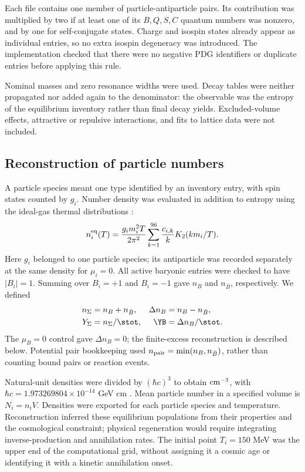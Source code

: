 Each file contains one member of particle-antiparticle pairs. Its contribution was multiplied by two if at least one of its $B,Q,S,C$ quantum numbers was nonzero, and by one for self-conjugate states. Charge and isospin states already appear as individual entries, so no extra isospin degeneracy was introduced. The implementation checked that there were no negative PDG identifiers or duplicate entries before applying this rule.

Nominal masses and zero resonance widths were used. Decay tables were neither propagated nor added again to the denominator: the observable was the entropy of the equilibrium inventory rather than final decay yields. Excluded-volume effects, attractive or repulsive interactions, and fits to lattice data were not included.

\subsection{Reconstruction of particle numbers}
A particle species meant one type identified by an inventory entry, with spin states counted by $g_i$. Number density was evaluated in addition to entropy using the ideal-gas thermal distributions \citep{Vovchenko2019}:
\begin{equation}
n_i^{\rm eq}(T)=\frac{g_i m_i^2T}{2\pi^2}
\sum_{k=1}^{96}\frac{c_{i,k}}{k}K_2(km_i/T).
\label{eq:number}
\end{equation}
Here $g_i$ belonged to one particle species; its antiparticle was recorded separately at the same density for $\mu_i=0$. All active baryonic entries were checked to have $|B_i|=1$. Summing over $B_i=+1$ and $B_i=-1$ gave $n_B$ and $n_{\bar B}$, respectively. We defined
\begin{align}
n_\Sigma&=n_B+n_{\bar B}, & \Delta n_B&=n_B-n_{\bar B},\\
Y_\Sigma&=n_\Sigma/\stot, & \YB&=\Delta n_B/\stot.
\label{eq:yields}
\end{align}
The $\mu_B=0$ control gave $\Delta n_B=0$; the finite-excess reconstruction is described below. Potential pair bookkeeping used $n_{\rm pair}=\min(n_B,n_{\bar B})$, rather than counting bound pairs or reaction events.

Natural-unit densities were divided by $(\hbar c)^3$ to obtain ${\rm cm^{-3}}$, with $\hbar c=1.973269804\times10^{-14}$ GeV cm \citep{Robinson2025}. Mean particle number in a specified volume is $N_i=n_iV$. Densities were exported for each particle species and temperature. Reconstruction inferred these equilibrium populations from their properties and the cosmological constraint; physical regeneration would require integrating inverse-production and annihilation rates. The initial point $T_i=150$ MeV was the upper end of the computational grid, without assigning it a cosmic age or identifying it with a kinetic annihilation onset.

